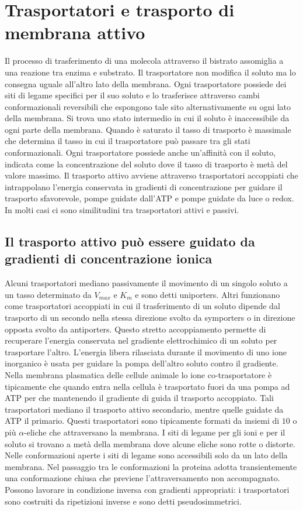 \section{Trasportatori e trasporto di membrana attivo}
Il processo di trasferimento di una molecola attraverso il bistrato assomiglia a una reazione tra enzima e substrato. Il trasportatore non modifica il soluto ma lo consegna uguale 
all'altro lato della membrana. Ogni trasportatore possiede dei siti di legame specifici per il suo soluto e lo trasferisce attraverso cambi conformazionali reversibili che espongono 
tale sito alternativamente su ogni lato della membrana. Si trova uno stato intermedio in cui il soluto \`e inaccessibile da ogni parte della membrana. Quando \`e saturato il tasso di
trasporto \`e massimale che determina il tasso in cui il trasportatore pu\`o passare tra gli stati conformazionali. Ogni trasportatore possiede anche un'affinit\`a con il soluto, 
indicata come la concentrazione del soluto dove il tasso di trasporto \`e met\`a del valore massimo. Il trasporto attivo avviene attraverso trasportatori accoppiati che intrappolano
l'energia conservata in gradienti di concentrazione per guidare il trasporto sfavorevole, pompe guidate dall'ATP e pompe guidate da luce o redox. In molti casi ci sono similitudini
tra trasportatori attivi e passivi. 
\subsection{Il trasporto attivo pu\`o essere guidato da gradienti di concentrazione ionica}
Alcuni trasportatori mediano passivamente il movimento di un singolo soluto a un tasso determinato da $V_{max}$ e $K_m$ e sono detti uniporters. Altri funzionano come trasportatori
accoppiati in cui il trasferimento di un soluto dipende dal trasporto di un secondo nella stessa direzione svolto da symporters o in direzione opposta svolto da antiporters. Questo 
stretto accoppiamento permette di recuperare l'energia conservata nel gradiente elettrochimico di un soluto per trasportare l'altro. L'energia libera rilasciata durante il movimento di
uno ione inorganico \`e usata per guidare la pompa dell'altro soluto contro il gradiente. Nella membrana plasmatica delle cellule animale lo ione co-trasportatore \`e tipicamente 
 che quando entra nella cellula \`e trasportato fuori da una pompa ad ATP per  che mantenendo il gradiente di  guida il trasporto accoppiato. Tali 
trasportatori mediano il trasporto attivo secondario, mentre quelle guidate da ATP il primario. Questi trasportatori sono tipicamente formati da insiemi di $10$ o pi\`u $\alpha$-eliche
che attraversano la membrana. I siti di legame per gli ioni e per il soluto si trovano a met\`a della membrana dove alcune eliche sono rotte o distorte. Nelle conformazioni aperte 
i siti di legame sono accessibili solo da un lato della membrana. Nel passaggio tra le conformazioni la proteina adotta transientemente una conformazione chiusa che previene 
l'attraversamento non accompagnato. Possono lavorare in condizione inversa con gradienti appropriati: i trasportatori sono costruiti da ripetizioni inverse e sono detti pseudosimmetrici.
